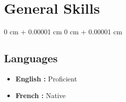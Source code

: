 \documentclass[10pt, letterpaper]{article}
\newenvironment{highlights}{
  \begin{itemize}[
    topsep=0.10 cm,
    parsep=0.10 cm,
    partopsep=0pt,
    itemsep=0pt,
    leftmargin=0 cm + 10pt
  ]
}{
  \end{itemize}
} %
\newenvironment{onecolentry}{
  \begin{adjustwidth}{
    0 cm + 0.00001 cm
  }{
    0 cm + 0.00001 cm
  }
}{
  \end{adjustwidth}
} %
\begin{document}
\section{General Skills}
\begin{onecolentry}
\subsection{Languages}
\begin{highlights}
\item \textbf{English :} Proficient
\item \textbf{French :} Native
\end{highlights}
\end{onecolentry}
\end{document}
